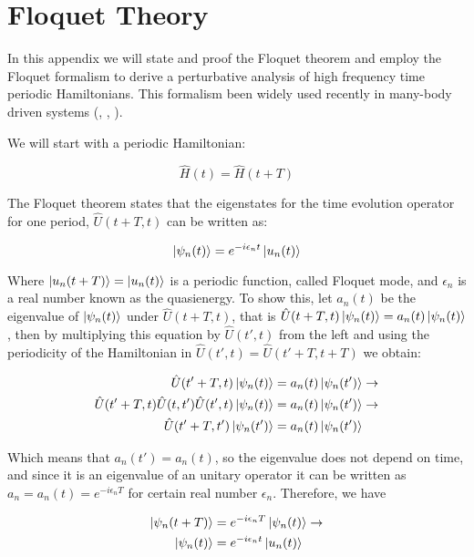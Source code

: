 \chapter{Floquet Theory}
\label{APE}
In this appendix we will state and proof the Floquet theorem and employ the Floquet formalism to derive a perturbative analysis of high frequency time periodic Hamiltonians. This formalism been widely used recently in many-body driven systems (\cite{Desbuquois2017}, \cite{Bordia2017}, \cite{Gorg2018}).

We will start with a periodic Hamiltonian:

\begin{equation}
\hat{H}(t) = \hat{H}(t+T)
\end{equation}

The Floquet theorem states that the eigenstates for the time evolution operator for one period, $\hat{U}(t+T,t)$ can be written as:

\begin{equation}
\label{FloquetMode}
\ket{\psi_n(t)} = e^{-i \epsilon_n t}\ket{u_n(t)}
\end{equation}

Where $\ket{u_n(t+T)} = \ket{u_n(t)}$ is a periodic function, called Floquet mode, and $\epsilon_n$ is a real number known as the quasienergy. To show this, let $a_n(t)$ be the eigenvalue of $\ket{\psi_n(t)}$ under $\hat{U}(t+T,t)$, that is $\hat{U}(t+T,t)\ket{\psi_n(t)} = a_n(t)\ket{\psi_n(t)}$, then by multiplying this equation by $\hat{U}(t',t)$ from the left and using the periodicity of the Hamiltonian in $\hat{U}(t',t) = \hat{U}(t'+T,t+T)$ we obtain:

\begin{align*}
\hat{U}(t'+T,t) \ket{\psi_n(t)} &= a_n(t)\ket{\psi_n(t')} \rightarrow \\
\hat{U}(t'+T,t) \hat{U}(t,t')\hat{U}(t',t) \ket{\psi_n(t)} &= a_n(t)\ket{\psi_n(t')} \rightarrow \\
\hat{U}(t'+T,t') \ket{\psi_n(t')} &= a_n(t)\ket{\psi_n(t')}
\end{align*}

Which means that $a_n(t') = a_n(t)$, so the eigenvalue does not depend on time, and since it is an eigenvalue of an unitary operator it can be written as $a_n = a_n(t) = e^{-i\epsilon_nT}$ for certain real number $\epsilon_n$. Therefore, we have 

\begin{align*}
\ket{\psi_n(t+T)} &= e^{-i\epsilon_nT} \ket{\psi_n(t)} \rightarrow \\
\ket{\psi_n(t)} &= e^{-i\epsilon_nt} \ket{u_n(t)}
\end{align*}

